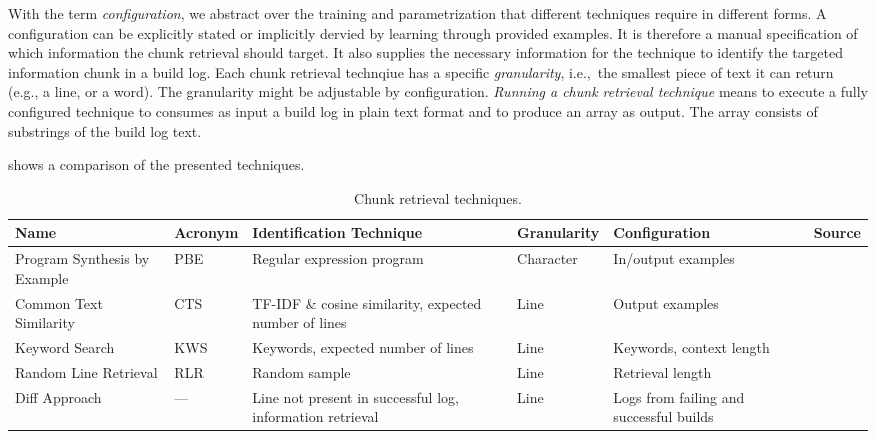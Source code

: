 With the term \textit{configuration}, we abstract over the training
and parametrization that different techniques require in different
forms.
A configuration can be explicitly stated or implicitly dervied
by learning through provided examples.
It is therefore a manual
specification of which information the chunk retrieval should target.
It also supplies the necessary information for the technique to
identify the targeted information chunk in a build log.
Each chunk
retrieval technqiue has a specific \textit{granularity}, i.e.,\ the
smallest piece of text it can return (e.g., a line, or a word).
The
granularity might be adjustable by configuration.
\emph{Running a
chunk retrieval technique} means to execute a fully configured
technique to consumes as input a build log in plain text format and to
produce an array as output.
The array consists of substrings of the
build log text.

 shows a comparison of the presented techniques.

\begin{table}[]
\centering
\caption{Chunk retrieval techniques.}
\begin{tabularx}{\textwidth}{@{}XlXlXX@{}}
\toprule
Name			     & Acronym & Identification Technique
& Granularity & Configuration & Source		  \\
\midrule
Program Synthesis by Example & PBE     & Regular expression program
& Character   & In/output examples	\\
Common Text Similarity	     & CTS     & TF-IDF \& cosine similarity,
expected number of lines & Line        & Output examples	   \\
Keyword Search		     & KWS     & Keywords, expected number of
lines			 & Line        & Keywords, context length  \\
Random Line Retrieval	     & RLR     & Random sample
& Line	      & Retrieval length	  \\
Diff Approach		     & ---     & Line not present in successful
log, information retrieval  & Line	  & Logs from failing and
successful builds      \\
\bottomrule
\end{tabularx}
\label{tab:ctr}
\end{table}


